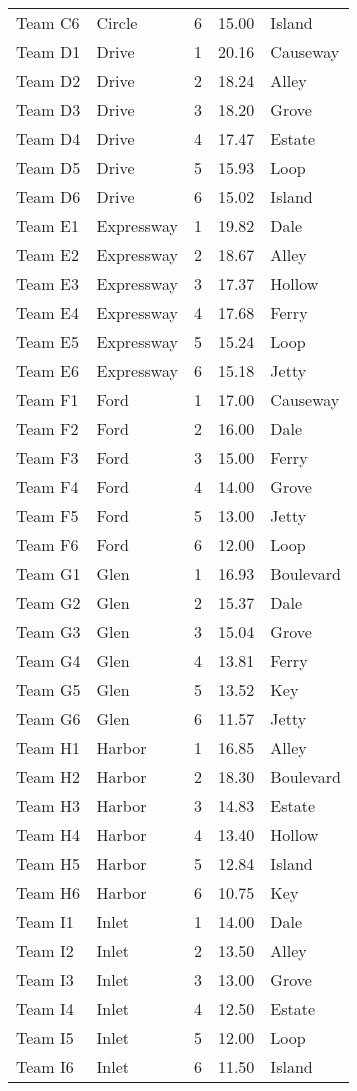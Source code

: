 \documentclass{article}%
\begin{document}
\begin{longtable}{|l|lcc|l|}
Team C6&Circle&6&15.00&Island\\%
Team D1&Drive&1&20.16&Causeway\\%
Team D2&Drive&2&18.24&Alley\\%
Team D3&Drive&3&18.20&Grove\\%
Team D4&Drive&4&17.47&Estate\\%
Team D5&Drive&5&15.93&Loop\\%
Team D6&Drive&6&15.02&Island\\%
Team E1&Expressway&1&19.82&Dale\\%
Team E2&Expressway&2&18.67&Alley\\%
Team E3&Expressway&3&17.37&Hollow\\%
Team E4&Expressway&4&17.68&Ferry\\%
Team E5&Expressway&5&15.24&Loop\\%
Team E6&Expressway&6&15.18&Jetty\\%
Team F1&Ford&1&17.00&Causeway\\%
Team F2&Ford&2&16.00&Dale\\%
Team F3&Ford&3&15.00&Ferry\\%
Team F4&Ford&4&14.00&Grove\\%
Team F5&Ford&5&13.00&Jetty\\%
Team F6&Ford&6&12.00&Loop\\%
Team G1&Glen&1&16.93&Boulevard\\%
Team G2&Glen&2&15.37&Dale\\%
Team G3&Glen&3&15.04&Grove\\%
Team G4&Glen&4&13.81&Ferry\\%
Team G5&Glen&5&13.52&Key\\%
Team G6&Glen&6&11.57&Jetty\\%
Team H1&Harbor&1&16.85&Alley\\%
Team H2&Harbor&2&18.30&Boulevard\\%
Team H3&Harbor&3&14.83&Estate\\%
Team H4&Harbor&4&13.40&Hollow\\%
Team H5&Harbor&5&12.84&Island\\%
Team H6&Harbor&6&10.75&Key\\%
Team I1&Inlet&1&14.00&Dale\\%
Team I2&Inlet&2&13.50&Alley\\%
Team I3&Inlet&3&13.00&Grove\\%
Team I4&Inlet&4&12.50&Estate\\%
Team I5&Inlet&5&12.00&Loop\\%
Team I6&Inlet&6&11.50&Island\\%

\end{longtable}
\end{document}
